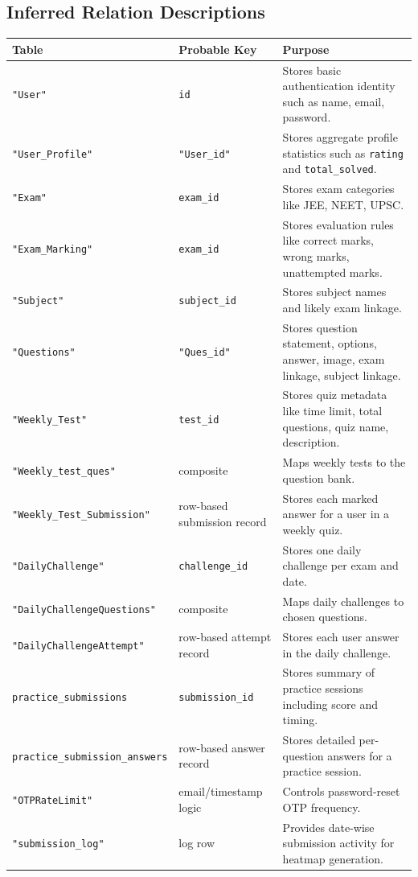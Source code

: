 \documentclass[12pt,a4paper]{article}
\begin{document}
\subsection{Inferred Relation Descriptions}
\begin{longtable}{p{3.2cm}p{3.2cm}p{8cm}}
\toprule
\textbf{Table} & \textbf{Probable Key} & \textbf{Purpose} \\
\midrule
\texttt{"User"} & \texttt{id} & Stores basic authentication identity such as name, email, password. \\
\texttt{"User\_Profile"} & \texttt{"User\_id"} & Stores aggregate profile statistics such as \texttt{rating} and \texttt{total\_solved}. \\
\texttt{"Exam"} & \texttt{exam\_id} & Stores exam categories like JEE, NEET, UPSC. \\
\texttt{"Exam\_Marking"} & \texttt{exam\_id} & Stores evaluation rules like correct marks, wrong marks, unattempted marks. \\
\texttt{"Subject"} & \texttt{subject\_id} & Stores subject names and likely exam linkage. \\
\texttt{"Questions"} & \texttt{"Ques\_id"} & Stores question statement, options, answer, image, exam linkage, subject linkage. \\
\texttt{"Weekly\_Test"} & \texttt{test\_id} & Stores quiz metadata like time limit, total questions, quiz name, description. \\
\texttt{"Weekly\_test\_ques"} & composite & Maps weekly tests to the question bank. \\
\texttt{"Weekly\_Test\_Submission"} & row-based submission record & Stores each marked answer for a user in a weekly quiz. \\
\texttt{"DailyChallenge"} & \texttt{challenge\_id} & Stores one daily challenge per exam and date. \\
\texttt{"DailyChallengeQuestions"} & composite & Maps daily challenges to chosen questions. \\
\texttt{"DailyChallengeAttempt"} & row-based attempt record & Stores each user answer in the daily challenge. \\
\texttt{practice\_submissions} & \texttt{submission\_id} & Stores summary of practice sessions including score and timing. \\
\texttt{practice\_submission\_answers} & row-based answer record & Stores detailed per-question answers for a practice session. \\
\texttt{"OTPRateLimit"} & email/timestamp logic & Controls password-reset OTP frequency. \\
\texttt{"submission\_log"} & log row & Provides date-wise submission activity for heatmap generation. \\
\bottomrule
\end{longtable}
\end{document}
